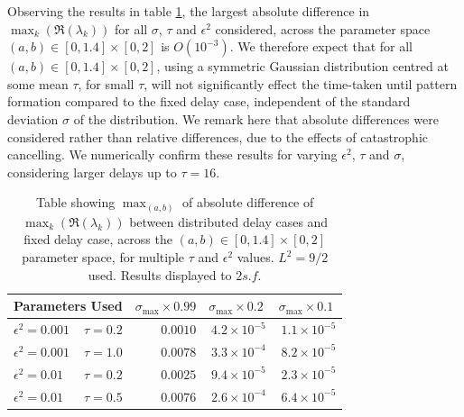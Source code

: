 Observing the results in table \ref{tab:tab1}, the largest absolute difference in $\max_k(\Re(\lambda_k))$ for all $\sigma$, $\tau$ and $\epsilon^2$ considered, across the parameter space $(a,b)\in[0,1.4]\times[0,2]$ is $O(10^{-3})$. We therefore expect that for all $(a,b)\in[0,1.4]\times[0,2]$,
using a symmetric Gaussian distribution centred at some mean $\tau$, for small $\tau$, will not significantly effect the time-taken until pattern formation compared to the fixed delay case, independent of the standard deviation $\sigma$ of the distribution. We remark here that absolute differences were considered rather than relative differences, due to the effects of catastrophic cancelling. We numerically confirm these results for varying $\epsilon^2$, $\tau$ and $\sigma$, considering larger delays up to $\tau=16$.

\begin{table}[H]
\centering
\begin{tabular}{lrrrr}
\hline
\multicolumn{2}{c}{Parameters Used}    & $\sigma_{\max}\times0.99$ & $\sigma_{\max}\times0.2\ $ & $\sigma_{\max}\times0.1\ $ \\ \hline
$\epsilon^2=0.001$ & \textbf{$\tau=0.2$} & $0.0010$                           & $4.2\times10^{-5}$                & $1.1\times10^{-5}$                \\
$\epsilon^2=0.001$ & $\tau=1.0$          & $0.0078$                           & $3.3\times10^{-4}$                & $8.2\times10^{-5}$                \\
$\epsilon^2=0.01$  & \textbf{$\tau=0.2$} & $0.0025$                           & $9.4\times10^{-5}$                & $2.3\times10^{-5}$                \\
$\epsilon^2=0.01$  & \textbf{$\tau=0.5$} & \textbf{$0.0076$}                  & $2.6\times10^{-4}$                & $6.4\times10^{-5}$               \\ \hline
\end{tabular}
\caption{Table showing $\max_{(a,b)}$ of absolute difference of $\max_k(\Re(\lambda_k))$ between distributed delay cases and fixed delay case, across the $(a,b)\in[0,1.4]\times[0,2]$ parameter space, for multiple $\tau$ and $\epsilon^2$ values. $L^2=9/2$ used. Results displayed to $2s.f.$}
\label{tab:tab1}
\end{table}

